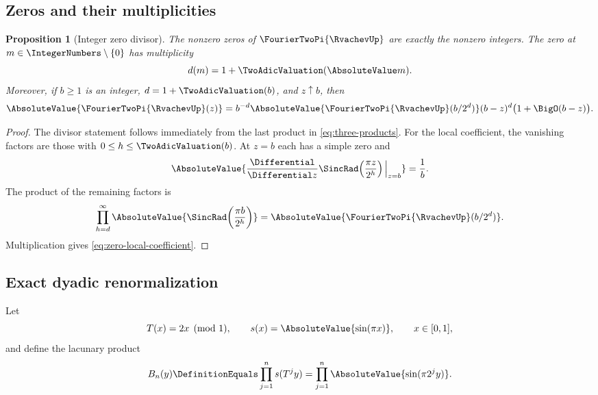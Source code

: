 \documentclass[11pt,oneside]{article}
\numberwithin{equation}{section}
\newtheorem{proposition}[theorem]{Proposition}
\theoremstyle{definition}
\theoremstyle{remark}
\begin{document}
\subsection{Zeros and their multiplicities}

\begin{proposition}[Integer zero divisor]
\label{prop:zero-divisor}
The nonzero zeros of $\FourierTwoPi{\RvachevUp}$ are exactly the nonzero integers.  The zero at
$m\in\IntegerNumbers\setminus\{0\}$ has multiplicity
\[
 d(m)=1+\TwoAdicValuation(\AbsoluteValue m).
\]
Moreover, if $b\ge1$ is an integer, $d=1+\TwoAdicValuation(b)$, and $z\uparrow b$, then
\begin{equation}
 \AbsoluteValue{\FourierTwoPi{\RvachevUp}(z)}
 =b^{-d}\AbsoluteValue{\FourierTwoPi{\RvachevUp}(b/2^d)}(b-z)^d\bigl(1+\BigO(b-z)\bigr).
 \label{eq:zero-local-coefficient}
\end{equation}
\end{proposition}

\begin{proof}
The divisor statement follows immediately from the last product in
\eqref{eq:three-products}.  For the local coefficient, the vanishing factors are those with
$0\le h\le\TwoAdicValuation(b)$.  At $z=b$ each has a simple zero and
\[
 \AbsoluteValue{\frac{\Differential}{\Differential z}\SincRad\!\left(\frac{\pi z}{2^h}\right)\Big|_{z=b}}
 =\frac1b.
\]
The product of the remaining factors is
\[
 \prod_{h=d}^{\infty}
 \AbsoluteValue{\SincRad\!\left(\frac{\pi b}{2^h}\right)}
 =\AbsoluteValue{\FourierTwoPi{\RvachevUp}(b/2^d)}.
\]
Multiplication gives \eqref{eq:zero-local-coefficient}.
\end{proof}

\subsection{Exact dyadic renormalization}
\label{subsec:dyadic-renormalization}

Let
\[
 T(x)=2x\pmod1,
 \qquad
 s(x)=\AbsoluteValue{\sin(\pi x)},
 \qquad x\in[0,1],
\]
and define the lacunary product
\begin{equation}
 B_n(y)\DefinitionEquals\prod_{j=1}^{n}s(T^j y)
 =\prod_{j=1}^{n}\AbsoluteValue{\sin(\pi2^j y)}.
 \label{eq:Bny}
\end{equation}
\end{document}
